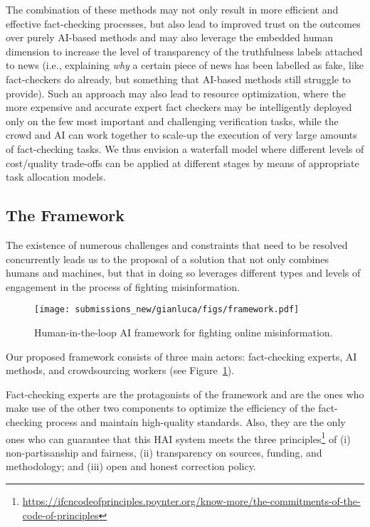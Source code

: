 \documentclass[11pt]{article}
\begin{document}
The combination of these methods may not only result in more efficient and effective fact-checking processes, but also lead to improved trust on the outcomes over purely AI-based methods and may also leverage the embedded human dimension to increase the level of transparency of the truthfulness labels attached to news (i.e., explaining \textit{why} a certain piece of news has been labelled as fake, like fact-checkers do already, but something that AI-based methods still struggle to provide).
% 
Such an approach may also lead to resource optimization, where the more expensive and accurate expert fact checkers may be intelligently deployed only on the few most important and challenging verification tasks, while the crowd and AI can work together to scale-up the execution of very large amounts of fact-checking tasks.
% 
We thus envision a waterfall model where different levels of cost/quality trade-offs can be applied at different stages by means of appropriate task allocation models. 



\subsection{The Framework}
\label{sec:crowdAIexperts}

The existence of numerous challenges and constraints that need to be resolved concurrently leads us to the proposal of a solution that not only combines humans and machines, but that in doing so leverages different types and levels of engagement in the process of fighting misinformation.
% 
\begin{figure}[tb]
    \centering
    \texttt{[image: submissions\_new/gianluca/figs/framework.pdf]}
    \caption{Human-in-the-loop AI framework for fighting online misinformation.}
    \label{fig:framework}
\end{figure}
% 
Our proposed framework consists of three main actors: fact-checking experts, AI methods, and crowdsourcing workers (see Figure~\ref{fig:framework}). 

Fact-checking experts are the protagonists of the framework and are the ones who make use of the other two components to optimize the efficiency of the fact-checking process and maintain high-quality standards. Also, they are the only ones who can guarantee that this HAI system meets the three principles\footnote{\url{https://ifcncodeofprinciples.poynter.org/know-more/the-commitments-of-the-code-of-principles}} of (i) non-partisanship and fairness, (ii) transparency on sources, funding, and methodology; and (iii) open and honest correction policy.
% 
\end{document}

